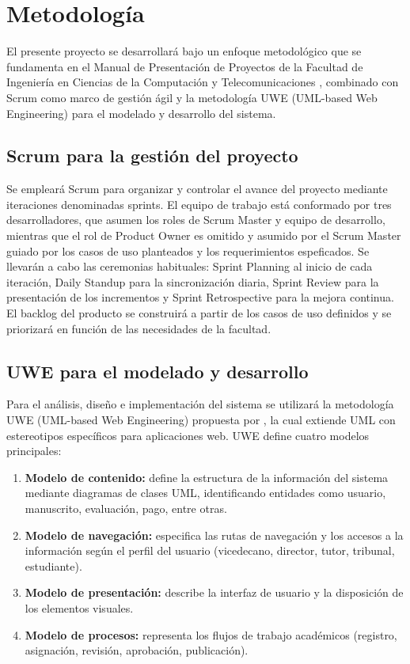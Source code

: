 \section{Metodología}
\label{sec:metodologia}

El presente proyecto se desarrollará bajo un enfoque metodológico que se fundamenta en el Manual de Presentación de Proyectos de la Facultad de Ingeniería en Ciencias de la Computación y Telecomunicaciones \textcite{calderon2013manual}, combinado con Scrum como marco de gestión ágil y la metodología UWE (UML-based Web Engineering) para el modelado y desarrollo del sistema.

\subsection{Scrum para la gestión del proyecto}

Se empleará Scrum para organizar y controlar el avance del proyecto mediante iteraciones denominadas sprints. El equipo de trabajo está conformado por tres desarrolladores, que asumen los roles de Scrum Master y equipo de desarrollo, mientras que el rol de Product Owner es omitido y asumido por el Scrum Master guiado por los casos de uso planteados y los requerimientos espeficados. Se llevarán a cabo las ceremonias habituales: Sprint Planning al inicio de cada iteración, Daily Standup para la sincronización diaria, Sprint Review para la presentación de los incrementos y Sprint Retrospective para la mejora continua. El backlog del producto se construirá a partir de los casos de uso definidos y se priorizará en función de las necesidades de la facultad.

\subsection{UWE para el modelado y desarrollo}

Para el análisis, diseño e implementación del sistema se utilizará la metodología UWE (UML-based Web Engineering) propuesta por \textcite{koch2001uwe}, la cual extiende UML con estereotipos específicos para aplicaciones web. UWE define cuatro modelos principales:

\begin{enumerate}
    \item \textbf{Modelo de contenido:} define la estructura de la información del sistema mediante diagramas de clases UML, identificando entidades como usuario, manuscrito, evaluación, pago, entre otras.
    \item \textbf{Modelo de navegación:} especifica las rutas de navegación y los accesos a la información según el perfil del usuario (vicedecano, director, tutor, tribunal, estudiante).
    \item \textbf{Modelo de presentación:} describe la interfaz de usuario y la disposición de los elementos visuales.
    \item \textbf{Modelo de procesos:} representa los flujos de trabajo académicos (registro, asignación, revisión, aprobación, publicación).
\end{enumerate}


